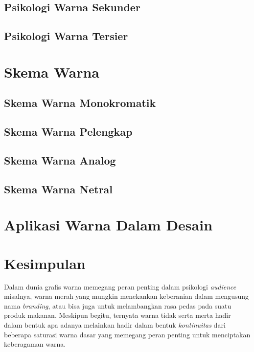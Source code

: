 \documentclass[a4paper,12pt]{article}
\begin{document}
\subsection{Psikologi Warna Sekunder}
\subsection{Psikologi Warna Tersier}

\section{Skema Warna}
\subsection{Skema Warna Monokromatik}
\subsection{Skema Warna Pelengkap}
\subsection{Skema Warna Analog}
\subsection{Skema Warna Netral}

\section{Aplikasi Warna Dalam Desain}
\newpage
\section{Kesimpulan}
Dalam dunia grafis warna memegang peran penting dalam psikologi \textit{audience} misalnya, warna merah yang mungkin menekankan keberanian dalam mengusung nama \textit{branding}, atau bisa juga untuk melambangkan rasa pedas pada suatu produk makanan. Meskipun begitu, ternyata warna tidak serta merta hadir dalam bentuk apa adanya melainkan hadir dalam bentuk \textit{kontinuitas} dari beberapa saturasi warna dasar yang memegang peran penting untuk menciptakan keberagaman warna.
\end{document}
